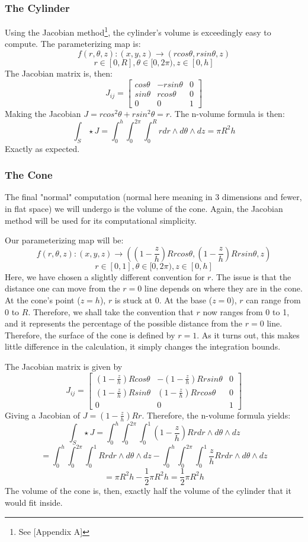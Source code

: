 \documentclass{article}
\begin{document}
\subsubsection{The Cylinder}
Using the Jacobian method\footnote{See [Appendix A]}, the cylinder's volume is exceedingly easy to compute. The parameterizing map is:
\[
f(r, \theta, z): (x, y, z) \rightarrow (r cos \theta, r sin \theta, z)
\]
\[
r \in [0, R], \theta \in [0, 2\pi), z \in [0, h]
\]
The Jacobian matrix is, then:
\[
J_{ij} = \begin{bmatrix}
cos \theta & -r sin \theta & 0 \\
sin \theta & r cos \theta & 0 \\
0 & 0 & 1
\end{bmatrix}
\]
Making the Jacobian $J = r cos^2 \theta + r sin^2 \theta = r$. The n-volume formula is then:
\[
\int_S \star J = \int_0^h\int_0^{2\pi}\int_0^R r dr \wedge d\theta \wedge dz = \pi R^2 h
\]
Exactly as expected.

\subsubsection{The Cone}
The final "normal" computation (normal here meaning in 3 dimensions and fewer, in flat space) we will undergo is the volume of the cone. Again, the Jacobian method will be used for its computational simplicity.

Our parameterizing map will be:
\[
f(r, \theta, z): (x, y, z) \rightarrow ((1-\frac{z}{h})Rr cos\theta, (1-\frac{z}{h})Rr sin\theta, z)
\]
\[
r \in [0, 1], \theta \in [0, 2\pi), z \in [0, h]
\]
Here, we have chosen a slightly different convention for $r$. The issue is that the distance one can move from the $r=0$ line depends on where they are in the cone. At the cone's point ($z=h$), $r$ is stuck at 0. At the base ($z=0$), $r$ can range from 0 to $R$. Therefore, we shall take the convention that $r$ now ranges from 0 to 1, and it represents the percentage of the possible distance from the $r=0$ line. Therefore, the surface of the cone is defined by $r=1$. As it turns out, this makes little difference in the calculation, it simply changes the integration bounds.

The Jacobian matrix is given by
\[
J_{ij} = \begin{bmatrix}
(1-\frac{z}{h})Rcos \theta & -(1-\frac{z}{h})Rr sin \theta & 0 \\
(1-\frac{z}{h})Rsin \theta & (1-\frac{z}{h})Rr cos \theta & 0 \\
0 & 0 & 1
\end{bmatrix}
\]
Giving a Jacobian of $J=(1-\frac{z}{h})Rr$. Therefore, the n-volume formula yields:
\[
\int_S \star J = \int_0^h\int_0^{2\pi}\int_0^1 (1-\frac{z}{h})Rr dr \wedge d\theta \wedge dz
\]
\[
= \int_0^h\int_0^{2\pi}\int_0^1 Rr dr \wedge d\theta \wedge dz - \int_0^h\int_0^{2\pi}\int_0^1 \frac{z}{h} Rr dr \wedge d\theta \wedge dz
\]
\[
= \pi R^2 h - \frac{1}{2} \pi R^2 h = \frac{1}{2} \pi R^2 h
\]
The volume of the cone is, then, exactly half the volume of the cylinder that it would fit inside.
\end{document}
